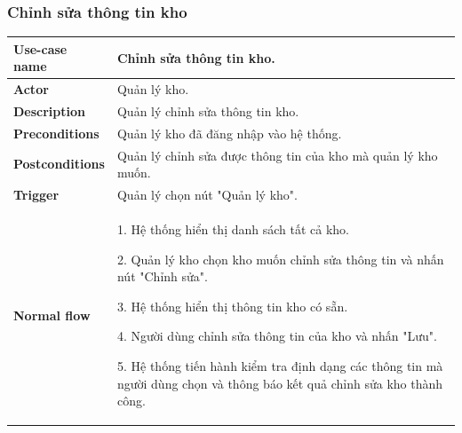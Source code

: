 \subsubsection{Chỉnh sửa thông tin kho}
{
    \setlength\extrarowheight{6pt}
    \begin{longtable}{| p{} | p{} |}
        \hline
        \textbf{Use-case name}
         &
        Chỉnh sửa thông tin kho.
        \\
        \hline
        \textbf{Actor}
         &
        Quản lý kho.
        \\
        \hline
        \textbf{Description}
         &
        Quản lý chỉnh sửa thông tin kho.
        \\
        \hline
        \textbf{Preconditions}
         &
        Quản lý kho đã đăng nhập vào hệ thống.
        \\
        \hline
        \textbf{Postconditions}
         &
        Quản lý chỉnh sửa được thông tin của kho mà quản lý kho muốn.
        \\
        \hline
        \textbf{Trigger}
         &
        Quản lý chọn nút "Quản lý kho".
        \\
        \hline
        \begin{flushleft}
            \textbf{Normal flow}
        \end{flushleft}
         &
        1. Hệ thống hiển thị danh sách tất cả kho.

        2. Quản lý kho chọn kho muốn chỉnh sửa thông tin và nhấn nút "Chỉnh sửa".

        3. Hệ thống hiển thị thông tin kho có sẵn.

        4. Người dùng chỉnh sửa thông tin của kho và nhấn "Lưu".

        5. Hệ thống tiến hành kiểm tra định dạng các thông tin mà người dùng chọn và thông báo kết quả chỉnh sửa kho thành công.


\end{longtable}}
